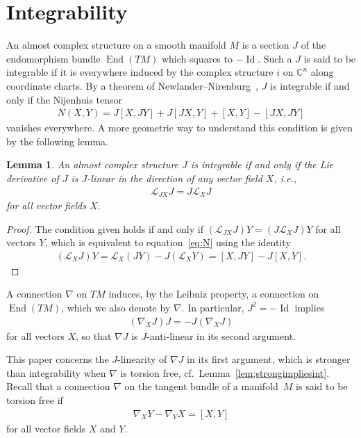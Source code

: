 \documentclass[pdftex]{sigma}
\newtheorem{lem}[thm]{Lemma}
\numberwithin{equation}{section}
\newcommand{\CC}{\mathbb{C}}
\begin{document}
\section{Integrability} \label{sec;int}

An almost complex structure on a smooth manifold $M$ is a section $J$ of the endomorphism bundle $\operatorname{End}(TM)$ which squares to $-\operatorname{Id}$. Such a $J$ is said to be integrable if it is everywhere induced by the complex structure $i$ on $\CC^n$ along coordinate charts. By a theorem of Newlander--Nirenburg~\cite{NN}, $J$ is integrable if and only if the Nijenhuis tensor
\begin{gather} \label{eq:N}
N(X,Y) = J[X,JY] + J[JX,Y] + [X,Y] - [JX,JY]
\end{gather}
vanishes everywhere. A more geometric way to understand this condition is given by the following lemma.

\begin{lem}An almost complex structure $J$ is integrable if and only if the Lie derivative of $J$ is $J$-linear in the direction of any vector field $X$, i.e.,
\begin{gather*}
\mathcal{L}_{JX} J = J \mathcal{L}_{X} J
\end{gather*}
for all vector fields $X$.
\end{lem}

\begin{proof}The condition given holds if and only if $( \mathcal{L}_{JX} J ) Y= ( J \mathcal{L}_{X} J ) Y$ for all vectors $Y$, which is equivalent to equation~\eqref{eq:N} using the identity
\begin{gather*}
( \mathcal{L}_{X} J ) Y = \mathcal{L}_{X} (JY) - J ( \mathcal{L}_{X} Y ) = [X,JY] - J[X,Y].\tag*{\qed}
\end{gather*} \renewcommand{\qed}{}
\end{proof}

A connection $\nabla$ on $TM$ induces, by the Leibniz property, a connection on $\operatorname{End}(TM)$, which we also denote by $\nabla$. In particular, $J^2=-\operatorname{Id}$ implies
\begin{gather*}
( \nabla_X J) J = -J (\nabla_X J)
\end{gather*}
for all vectors $X$, so that $\nabla J$ is $J$-anti-linear in its second argument.

This paper concerns the $J$-linearity of $\nabla J$ in its first argument, which is stronger than integrability when $\nabla$ is torsion free, cf.\ Lemma~\ref{lem;strongimpliesint}. Recall that a connection $\nabla$ on the tangent bundle of a manifold~$M$ is said to be torsion free if
 \begin{gather*}
 \nabla_X Y - \nabla_Y X = [X,Y]
 \end{gather*}
 for all vector fields $X$ and $Y$.
\end{document}
